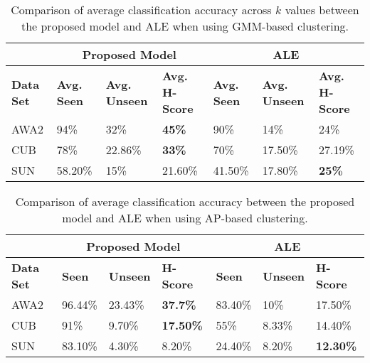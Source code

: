 \begin{table}[h]
\caption{Comparison of average classification accuracy across $k$ values between the proposed model and ALE when using GMM-based clustering.}
\centering
\begin{tabular}{@{}lllllll@{}}
\toprule
\textbf{}        & \multicolumn{3}{c}{\textbf{Proposed Model}}                            & \multicolumn{3}{c}{\textbf{ALE}}                                  \\ \midrule
\textbf{Data Set} & \textbf{Avg. Seen} & \textbf{Avg. Unseen} & \textbf{Avg. H-Score} & \textbf{Avg. Seen} & \textbf{Avg. Unseen} & \textbf{Avg. H-Score} \\
AWA2             & 94\%               & 32\%                 & \textbf{45\%}         & 90\%               & 14\%                 & 24\%                  \\
CUB              & 78\%               & 22.86\%              & \textbf{33\%}         & 70\%               & 17.50\%              & 27.19\%               \\
SUN              & 58.20\%            & 15\%                 & 21.60\%               & 41.50\%            & 17.80\%              & \textbf{25\%}         \\ \bottomrule
\end{tabular}
\label{table:gmm_com}
\end{table}

\par
\medskip

\begin{table}[ht]
\caption{Comparison of average classification accuracy between the proposed model and ALE when using AP-based clustering.}
\centering
\begin{tabular}{@{}lllllll@{}}
\toprule
                 & \multicolumn{3}{c}{\textbf{Proposed Model}}             & \multicolumn{3}{c}{\textbf{ALE}}                   \\ \midrule
\textbf{Data Set} & \textbf{Seen} & \textbf{Unseen} & \textbf{H-Score} & \textbf{Seen} & \textbf{Unseen} & \textbf{H-Score} \\
AWA2             & 96.44\%          & 23.43\%         & \textbf{37.7\%}    & 83.40\%       & 10\%            & 17.50\%          \\
CUB              & 91\%          & 9.70\%          & \textbf{17.50\%} & 55\%          & 8.33\%          & 14.40\%          \\
SUN              & 83.10\%       & 4.30\%          & 8.20\%           & 24.40\%       & 8.20\%          & \textbf{12.30\%} \\ \bottomrule
\end{tabular}
\label{table:af_com}
\end{table}

